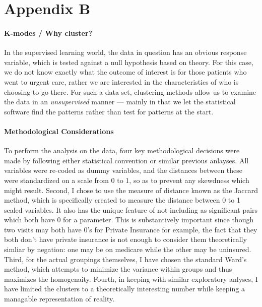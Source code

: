 \documentclass[12pt,twoside]{reedthesis}
\begin{document}
  \chapter*{Appendix B}\label{appendix-b}
  
  \setcounter{chapter}{8} \setcounter{section}{0} \doublespacing
  
  \subsubsection*{K-modes / Why cluster?}\label{k-modes-why-cluster}
  
  In the supervised learning world, the data in question has an obvious
  response variable, which is tested against a null hypothesis based on
  theory. For this case, we do not know exactly what the outcome of
  interest is for those patients who went to urgent care, rather we are
  interested in the characteristics of who is choosing to go there. For
  such a data set, clustering methods allow us to examine the data in an
  \emph{unsupervised} manner --- mainly in that we let the statistical
  software find the patterns rather than test for patterns at the start.
  
  \subsubsection*{Methodological
  Considerations}\label{methodological-considerations}
  
  To perform the analysis on the data, four key methodological decisions
  were made by following either statistical convention or similar previous
  anlayses. All variables were re-coded as dummy variables, and the
  distances between these were standardized on a scale from 0 to 1, so as
  to prevent any skewdness which might result. Second, I chose to use the
  measure of distance known as the Jaccard method, which is specifically
  created to measure the distance between 0 to 1 scaled variables. It also
  has the unique feature of not including as significant pairs which both
  have 0 for a parameter. This is substantively important since though two
  visits may both have 0's for Private Insurance for example, the fact
  that they both don't have private insurance is not enough to consider
  them theoretically simliar by negation: one may be on medicare while the
  other may be uninsured. Third, for the actual groupings themselves, I
  have chosen the standard Ward's method, which attempts to minimize the
  variance within groups and thus maximizes the homogenaity. Fourth, in
  keeping with similar exploratory anlyses, I have limited the clusters to
  a theoretically interesting number while keeping a managable
  representation of reality.
  
\end{document}
